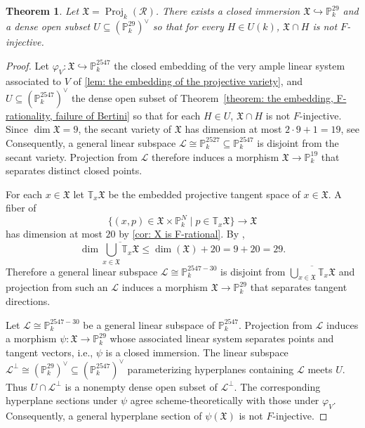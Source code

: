 \documentclass[reqno,11pt]{amsart}
\numberwithin{equation}{section}
\newtheorem{theorem}{Theorem}[section]
\theoremstyle{definition}
\theoremstyle{definition}
\theoremstyle{definition}
\theoremstyle{remark}
\newcommand{\Proj}{\operatorname{Proj}}
\newcommand{\PP}{\mathbb{P}}
\begin{document}
\begin{theorem}
    \label{thm: the projective example embeds in P^{25}}
    Let $\mathfrak{X} = \Proj_k(\mathcal{R})$. There exists a closed immersion $\mathfrak{X}\hookrightarrow \PP^{29}_k$ and a dense open subset $U\subseteq \left(\PP^{29}_k\right)^{\vee}$ so that for every $H\in U(k)$, $\mathfrak{X}\cap H$ is not $F$-injective.
\end{theorem}

\begin{proof}
    Let $\varphi_V:\mathfrak{X}\hookrightarrow \PP^{2547}_k$ the closed embedding of the very ample linear system associated to $V$ of \cref{lem: the embedding of the projective variety}, and $U\subseteq \left(\PP^{2547}_k\right)^\vee$ the dense open subset of Theorem~\ref{theorem: the embedding, F-rationality, failure of Bertini} so that for each $H\in U$, $\mathfrak{X}\cap H$ is not $F$-injective. Since $\dim \mathfrak{X}=9$, the secant variety of $\mathfrak{X}$ has dimension at most $2\cdot 9+1=19$, see \cite[\S~1.1]{Adl87} Consequently, a general linear subspace $\mathcal{L}\cong\PP^{2527}_k\subseteq\PP^{2547}_k$ is disjoint from the secant variety. Projection from $\mathcal{L}$ therefore induces a morphism $\mathfrak{X}\to\PP^{19}_k$ that separates distinct closed points.
    
    
    For each $x\in \mathfrak{X}$ let $\mathbb{T}_x\mathfrak{X}$ be the embedded projective tangent space of $x\in \mathfrak{X}$. A fiber of $$\{(x,p)\in \mathfrak{X}\times\PP^N_k\mid p\in\mathbb{T}_x\mathfrak{X}\}\to \mathfrak{X}$$ has dimension at most $20$ by \cref{cor: X is F-rational}. By \cite[\href{https://stacks.math.columbia.edu/tag/02JS}{Tag 02JS}]{stacks-project}, 
    \[
    \dim\overline{\bigcup_{x\in \mathfrak{X}}\mathbb{T}_x\mathfrak{X}}\leq \dim(\mathfrak{X}) + 20 = 9+ 20 = 29.
    \]
    Therefore a general linear subspace $\mathcal{L}\cong \PP^{2547-30}_k$ is disjoint from $\overline{\bigcup_{x\in \mathfrak{X}}\mathbb{T}_x\mathfrak{X}}$ and projection from such an $\mathcal{L}$ induces a morphism $\mathfrak{X}\to \PP^{29}_k$ that separates tangent directions. 
    
    Let $\mathcal{L}\cong \PP^{2547-30}_k$ be a general linear subspace of $\PP^{2547}_k$. Projection from $\mathcal{L}$ induces a morphism $\psi:\mathfrak{X}\to \PP^{29}_k$ whose associated linear system separates points and tangent vectors, i.e., $\psi$ is a closed immersion. The linear subspace $\mathcal{L}^\perp\cong(\PP^{29}_k)^\vee\subseteq(\PP^{2547}_k)^\vee$ parameterizing hyperplanes containing $\mathcal{L}$ meets $U$. Thus $U\cap\mathcal{L}^\perp$ is a nonempty dense open subset of $\mathcal{L}^\perp$. The corresponding hyperplane sections under $\psi$ agree scheme-theoretically with those under $\varphi_V$. Consequently, a general hyperplane section of $\psi(\mathfrak{X})$ is not $F$-injective.
\end{proof}


\printbibliography
\end{document}
